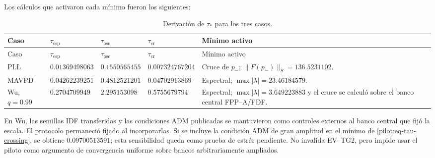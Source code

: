 Los cálculos que activaron cada mínimo fueron los siguientes:
\begingroup
\footnotesize
\begin{longtable}{@{}L{2.0cm}C{2.25cm}C{2.25cm}C{2.25cm}L{4.4cm}@{}}
\caption{Derivación de $\tau_*$ para los tres casos.}
\label{pilot:tab-tau-star}\\
\toprule
Caso & $\tau_{\mathrm{esp}}$ & $\tau_{\mathrm{osc}}$ &
$\tau_{\mathrm{cr}}$ & Mínimo activo\\
\midrule
\endfirsthead
\toprule
Caso & $\tau_{\mathrm{esp}}$ & $\tau_{\mathrm{osc}}$ &
$\tau_{\mathrm{cr}}$ & Mínimo activo\\
\midrule
\endhead
PLL & $0.01369498063$ & $0.1550565455$ & $0.007324767204$ &
Cruce de $p_-$; $\lVert F(p_-)\rVert_S=136.5231102$.\\
MAVPD & $0.04262239251$ & $0.4812521201$ & $0.04702913869$ &
Espectral; $\max|\lambda|=23.46184579$.\\
Wu, $q=0.99$ & $0.2704709949$ & $2.295153098$ & $0.5755679794$ &
Espectral; $\max|\lambda|=3.649223883$ y el cruce se calculó sobre el banco
central FPP--A/FDF.\\
\bottomrule
\end{longtable}
\endgroup

En Wu, las semillas IDF transferidas y las condiciones ADM publicadas se
mantuvieron como controles externos al banco central que fijó la escala. El
protocolo permaneció fijado al incorporarlas. Si se incluye la
condición ADM de gran amplitud en el mínimo de
\eqref{pilot:eq-tau-crossing}, se obtiene $0.09700513591$; esta sensibilidad
queda como prueba de estrés pendiente. No invalida EV--TG2, pero impide usar el
piloto como argumento de convergencia uniforme sobre bancos arbitrariamente
ampliados.

